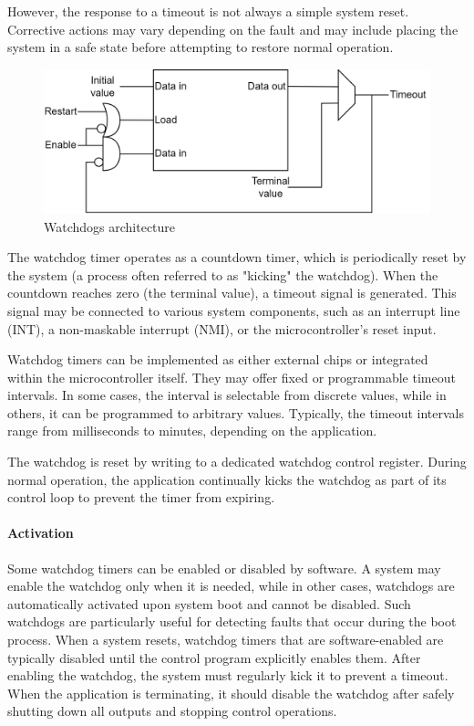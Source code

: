 However, the response to a timeout is not always a simple system reset. 
Corrective actions may vary depending on the fault and may include placing the system in a safe state before attempting to restore normal operation.
\begin{figure}[H]
    \centering
    \includegraphics[width=0.75\linewidth]{images/wdog.png}
    \caption{Watchdogs architecture}
\end{figure}
The watchdog timer operates as a countdown timer, which is periodically reset by the system (a process often referred to as "kicking" the watchdog). 
When the countdown reaches zero (the terminal value), a timeout signal is generated. 
This signal may be connected to various system components, such as an interrupt line (INT), a non-maskable interrupt (NMI), or the microcontroller's reset input.

Watchdog timers can be implemented as either external chips or integrated within the microcontroller itself. 
They may offer fixed or programmable timeout intervals. 
In some cases, the interval is selectable from discrete values, while in others, it can be programmed to arbitrary values. 
Typically, the timeout intervals range from milliseconds to minutes, depending on the application.

The watchdog is reset by writing to a dedicated watchdog control register. 
During normal operation, the application continually kicks the watchdog as part of its control loop to prevent the timer from expiring.

\paragraph*{Activation}
Some watchdog timers can be enabled or disabled by software. 
A system may enable the watchdog only when it is needed, while in other cases, watchdogs are automatically activated upon system boot and cannot be disabled. 
Such watchdogs are particularly useful for detecting faults that occur during the boot process.
When a system resets, watchdog timers that are software-enabled are typically disabled until the control program explicitly enables them.
After enabling the watchdog, the system must regularly kick it to prevent a timeout. 
When the application is terminating, it should disable the watchdog after safely shutting down all outputs and stopping control operations.

